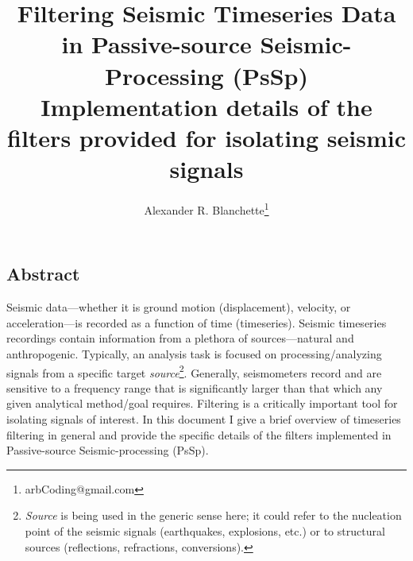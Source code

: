 \documentclass[american, twoside]{article}
\title{\Huge Filtering Seismic Timeseries Data in Passive-source Seismic-Processing (PsSp)\\
\large Implementation details of the filters provided for isolating seismic signals}
\author{Alexander R. Blanchette\thanks{arbCoding@gmail.com}}
\date{\Today}
\begin{document}
\maketitle
\pagestyle{fancy}
\begin{tcolorbox}
    \section*{Abstract} \label{Abstract}
    Seismic data---whether it is ground motion (displacement), velocity, or acceleration---is recorded as a function of time (timeseries). Seismic timeseries
    recordings contain information from a plethora of sources---natural and anthropogenic. Typically, an analysis task is focused on processing/analyzing
    signals from a specific target \textit{source}\footnote{\textit{Source} is being used in the generic sense here; it could refer to the nucleation point of the seismic
    signals (earthquakes, explosions, etc.) or to structural sources (reflections, refractions, conversions).}. Generally, seismometers record and are sensitive
    to a frequency range that is significantly larger than that which any given analytical method/goal requires. Filtering is a critically important tool for
    isolating signals of interest. In this document I give a brief overview of timeseries filtering in general and provide the specific details of the filters
    implemented in Passive-source Seismic-processing (PsSp).
\end{tcolorbox}

\newpage
\begin{tcolorbox}
    \renewcommand\cftsecfont{\large}
    \renewcommand\cftsecpagefont{\small}
    \tableofcontents
\end{tcolorbox}

\end{document}
